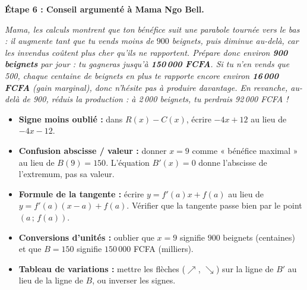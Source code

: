 \documentclass[11pt]{article}
\begin{document}
\begin{exoresolu}
\textbf{Étape 6 : Conseil argumenté à Mama Ngo Bell.}

\emph{Mama, les calculs montrent que ton bénéfice suit une parabole tournée vers le bas : il augmente tant que tu vends moins de $900$ beignets, puis diminue au-delà, car les invendus coûtent plus cher qu'ils ne rapportent. Prépare donc environ \textbf{900 beignets} par jour : tu gagneras jusqu'à \textbf{150\,000 FCFA}. Si tu n'en vends que 500, chaque centaine de beignets en plus te rapporte encore environ \textbf{16\,000 FCFA} (gain marginal), donc n'hésite pas à produire davantage. En revanche, au-delà de 900, réduis la production : à 2\,000 beignets, tu perdrais 92\,000 FCFA !}
\end{exoresolu}

\begin{attention}
\begin{itemize}
\item \textbf{Signe moins oublié :} dans $R(x) - C(x)$, écrire $-4x + 12$ au lieu de $-4x - 12$.
\item \textbf{Confusion abscisse / valeur :} donner $x=9$ comme « bénéfice maximal » au lieu de $B(9)=150$. L'équation $B'(x)=0$ donne l'abscisse de l'extremum, pas sa valeur.
\item \textbf{Formule de la tangente :} écrire $y = f'(a)x + f(a)$ au lieu de $y = f'(a)(x-a) + f(a)$. Vérifier que la tangente passe bien par le point $(a\,;\,f(a))$.
\item \textbf{Conversions d'unités :} oublier que $x=9$ signifie $900$ beignets (centaines) et que $B=150$ signifie $150\,000$ FCFA (milliers).
\item \textbf{Tableau de variations :} mettre les flèches ($\nearrow$, $\searrow$) sur la ligne de $B'$ au lieu de la ligne de $B$, ou inverser les signes.
\end{itemize}
\end{attention}
\end{document}
